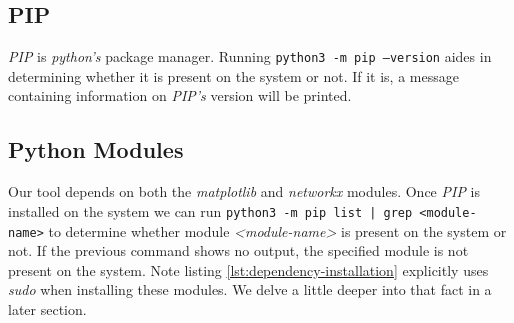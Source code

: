         \subsection{PIP}
            \textit{PIP} is \textit{python's} package manager. Running \texttt{\allowbreak python3 -m pip --version} aides in determining whether it is present on the system or not. If it is, a message containing information on \textit{PIP's} version will be printed.\\

        \subsection{Python Modules}
            Our tool depends on both the \textit{matplotlib} and \textit{networkx} modules. Once \textit{PIP} is installed on the system we can run \texttt{\allowbreak python3 -m pip list | grep <module-name>} to determine whether module \textit{<module-name>} is present on the system or not. If the previous command shows no output, the specified module is not present on the system. Note listing \ref{lst:dependency-installation} explicitly uses \textit{sudo} when installing these modules. We delve a little deeper into that fact in a later section.\\

